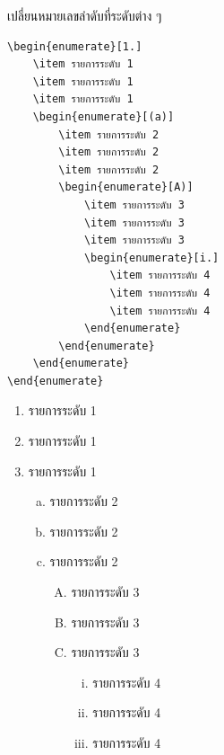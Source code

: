 \begin{exampleBox}[sidebyside]{เปลี่ยนหมายเลขลำดับที่ระดับต่าง ๆ}
\small
\begin{lstlisting}[frame=none,language={[LaTeX]TeX}]
\begin{enumerate}[1.]
    \item รายการระดับ 1
    \item รายการระดับ 1
    \item รายการระดับ 1
    \begin{enumerate}[(a)]
        \item รายการระดับ 2
        \item รายการระดับ 2
        \item รายการระดับ 2
        \begin{enumerate}[A)]
            \item รายการระดับ 3
            \item รายการระดับ 3
            \item รายการระดับ 3
            \begin{enumerate}[i.]
                \item รายการระดับ 4
                \item รายการระดับ 4
                \item รายการระดับ 4
            \end{enumerate}
        \end{enumerate}
    \end{enumerate}
\end{enumerate}
\end{lstlisting}
\tcblower
\small
\begin{enumerate}[1.]
    \item รายการระดับ 1
    \item รายการระดับ 1
    \item รายการระดับ 1
    \begin{enumerate}[(a)]
        \item รายการระดับ 2
        \item รายการระดับ 2
        \item รายการระดับ 2
        \begin{enumerate}[A)]
            \item รายการระดับ 3
            \item รายการระดับ 3
            \item รายการระดับ 3
            \begin{enumerate}[i.]
                \item รายการระดับ 4
                \item รายการระดับ 4
                \item รายการระดับ 4
            \end{enumerate}
        \end{enumerate}
    \end{enumerate}
\end{enumerate}
\end{exampleBox}


